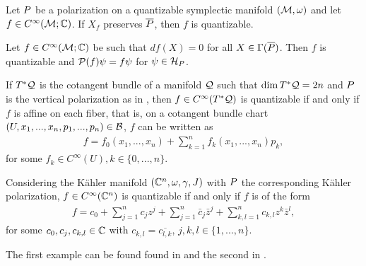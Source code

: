 \documentclass[notas.tex]{subfiles}
\begin{document}
\begin{thm}\label{thm_obs_quantizability}
	Let $P$ be a polarization on a quantizable symplectic manifold $(\mathcal{M}, \omega)$ and let $f \in C^\infty(\mathcal{M}; \mathbb{C})$. If $X_f$ preserves $\overline {P}$, then $f$ is quantizable.
\end{thm}

\begin{prop}
	Let $f \in C^\infty(\mathcal{M}; \mathbb{C})$ be such that $df(X) = 0$ for all $X \in \Gamma(\overline {P})$. Then $f$ is quantizable and $\mathcal{P}(f)\psi = f \psi$ for $\psi \in \mathcal{H}_P$.
\end{prop}

\begin{ex}\label{ex_quantizability_real}
	If $T^*\mathcal{Q}$ is the cotangent bundle of a manifold $\mathcal{Q}$ such that $\dim T^*\mathcal{Q} = 2n$ and $P$ is the vertical polarization as in , then $f \in C^\infty(T^*\mathcal{Q})$ is quantizable if and only if $f$ is affine on each fiber, that is, on a cotangent bundle chart $(U, x_1,...,x_n,p_1,...,p_n) \in \mathcal{B}$, $f$ can be written as 
	\begin{align*}
		f = f_0(x_1,...,x_n) + \sum_{k=1}^{n} f_k(x_1,...,x_n) p_k,
	\end{align*}
	for some $f_k \in C^\infty(U), k \in \{0,...,n\}$.
\end{ex}

\begin{ex}\label{ex_quantizability_complex}
	Considering the Kähler manifold $(\mathbb{C}^n, \omega, \gamma, J)$ with $P$ the corresponding Kähler polarization, $f \in C^\infty(\mathbb{C}^n)$ is quantizable if and only if $f$ is of the form
	\begin{align*}
		f = c_0 + \sum_{j=1}^{n} c_j z^j + \sum_{j=1}^{n} \bar{c}_j \bar{z}^j + \sum_{k,l = 1}^{n}c_{k,l} z^k \bar{z}^l,
	\end{align*}
	for some $c_0, c_j, c_{k,l} \in \mathbb{C}$ with $c_{k,l} = \overline{c_{l,k}}$, $j, k, l \in \{1,...,n\}$.
\end{ex}
The first example can be found found in \cite[Example 23.23]{hall_quantum_2013} and the second in \cite[page 174] {woodhouse_geometric_1992}.
\end{document}
